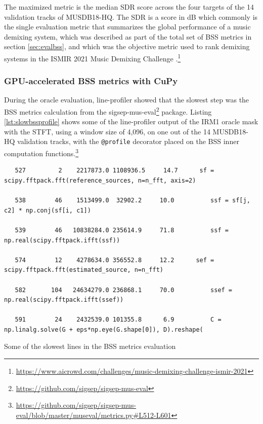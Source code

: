 \documentclass[report.tex]{subfiles}
\begin{document}
The maximized metric is the median SDR score across the four targets of the 14 validation tracks of MUSDB18-HQ. The SDR is a score in dB which commonly is the single evaluation metric that summarizes the global performance of a music demixing system, which was described as part of the total set of BSS metrics in section \ref{sec:evalbss}, and which was the objective metric used to rank demixing systems in the ISMIR 2021 Music Demixing Challenge \parencite{mdx21}.\footnote{\url{https://www.aicrowd.com/challenges/music-demixing-challenge-ismir-2021}}

\newpagefill

\subsubsection{GPU-accelerated BSS metrics with CuPy}
\label{sec:fasterbsscupy}

During the oracle evaluation, line-profiler showed that the slowest step was the BSS metrics calculation from the sigsep-mus-eval\footnote{\url{https://github.com/sigsep/sigsep-mus-eval}} package. Listing \ref{lst:slowbssprofile} shows some of the line-profiler output of the IRM1 oracle mask with the STFT, using a window size of 4,096, on one out of the 14 MUSDB18-HQ validation tracks, with the \Verb#@profile# decorator placed on the BSS inner computation functions.\footnote{\url{https://github.com/sigsep/sigsep-mus-eval/blob/master/museval/metrics.py\#L512-L601}}

\begin{listing}[h]
  \centering
\begin{verbatim}
   527         2    2217873.0 1108936.5     14.7      sf = scipy.fftpack.fft(reference_sources, n=n_fft, axis=2)

   538        46    1513499.0  32902.2     10.0          ssf = sf[j, c2] * np.conj(sf[i, c1])

   539        46   10838284.0 235614.9     71.8          ssf = np.real(scipy.fftpack.ifft(ssf))

   574        12    4278634.0 356552.8     12.2      sef = scipy.fftpack.fft(estimated_source, n=n_fft)

   582       104   24634279.0 236868.1     70.0          ssef = np.real(scipy.fftpack.ifft(ssef))

   591        24    2432539.0 101355.8      6.9          C = np.linalg.solve(G + eps*np.eye(G.shape[0]), D).reshape(
\end{verbatim}
  \caption{Some of the slowest lines in the BSS metrics evaluation}
  \label{lst:slowbssprofile}
\end{listing}
\end{document}

